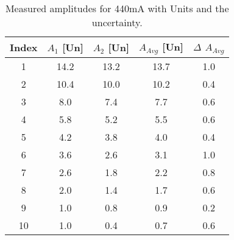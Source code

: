\begin{table}[h!]
    \centering
    \begin{tabular}{c|ccc|c}
        \hline
        \textbf{Index} & \textbf{$A_1$ [Un]} & \textbf{$A_2$ [Un]} & \textbf{$A_{Avg}$ [Un]} & \boldmath$\Delta$ \textbf{$A_{Avg}$} \\
        \hline
        1  & 14.2 & 13.2 & 13.7 & 1.0 \\
        2  & 10.4 & 10.0 & 10.2 & 0.4 \\
        3  & 8.0  & 7.4  & 7.7  & 0.6 \\
        4  & 5.8  & 5.2  & 5.5  & 0.6 \\
        5  & 4.2  & 3.8  & 4.0  & 0.4 \\
        6  & 3.6  & 2.6  & 3.1  & 1.0 \\
        7  & 2.6  & 1.8  & 2.2  & 0.8 \\
        8  & 2.0  & 1.4  & 1.7  & 0.6 \\
        9  & 1.0  & 0.8  & 0.9  & 0.2 \\
        10 & 1.0  & 0.4  & 0.7  & 0.6 \\
        \hline
    \end{tabular}
    \caption{Measured amplitudes for 440mA with Units and the uncertainty.}
    \label{tab:440mA}
\end{table}



